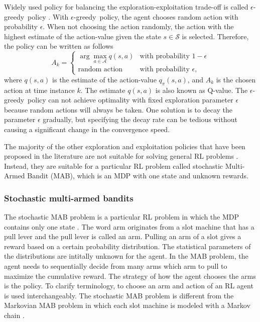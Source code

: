 \documentclass[english, 12pt, a4paper, elec, utf8, a-1b, online]{aaltothesis}
\numberwithin{equation}{section}
\newcommand{\Ss}{\mathcal{S}}
\newcommand{\As}{\mathcal{A}}
\newcommand{\egreedy}{$\epsilon$-greedy~}
\begin{document}
Widely used policy for balancing the exploration-exploitation trade-off is called \egreedy policy \cite{Sutton2018}.
With \egreedy policy, the agent chooses random action with probability $\epsilon$.
When not choosing the action randomly, the action with the highest estimate of the action-value given the state $s \in \Ss$ is selected.
Therefore, the policy can be written as follows
\begin{equation}\label{eq:epsilon_greedy}
    A_k =
    \left\{
        \begin{array}{ll}
            \arg\max_{a \in \As} q(s, a) & \text{with probability $1-\epsilon$}\\
            \text{random action} & \text{with probability $\epsilon$},
        \end{array}
    \right.
\end{equation}
where $q(s, a)$ is the estimate of the action-value $q_\pi(s, a)$, and $A_k$ is the chosen action at time instance $k$.
The estimate $q(s, a)$ is also known as Q-value.
The \egreedy policy can not achieve optimality with fixed exploration parameter $\epsilon$ because random actions will always be taken.
One solution is to decay the parameter $\epsilon$ gradually, but specifying the decay rate can be tedious without causing a significant change in the convergence speed.

The majority of the other exploration and exploitation policies that have been proposed in the literature are not suitable for solving general RL problems \cite{Lattimore2019}.
Instead, they are suitable for a particular RL problem called stochastic Multi-Armed Bandit (MAB), which is an MDP with one state and unknown rewards.

\subsubsection{Stochastic multi-armed bandits}\label{sec:MAB}

The stochastic MAB problem is a particular RL problem in which the MDP contains only one state \cite{Sutton2018}.
The word arm originates from a slot machine that has a pull lever and the pull lever is called an arm.
Pulling an arm of a slot gives a reward based on a certain probability distribution. 
The statistical parameters of the distributions are intitally unknown for the agent.
In the MAB problem, the agent needs to sequentially decide from many arms which arm to pull to maximize the cumulative reward.
The strategy of how the agent chooses the arms is the policy.
To clarify terminology, to choose an arm and action of an RL agent is used interchangeably.
The stochastic MAB problem is different from the Markovian MAB problem in which each slot machine is modeled with a Markov chain \cite{Katehakis1987}.
\end{document}
